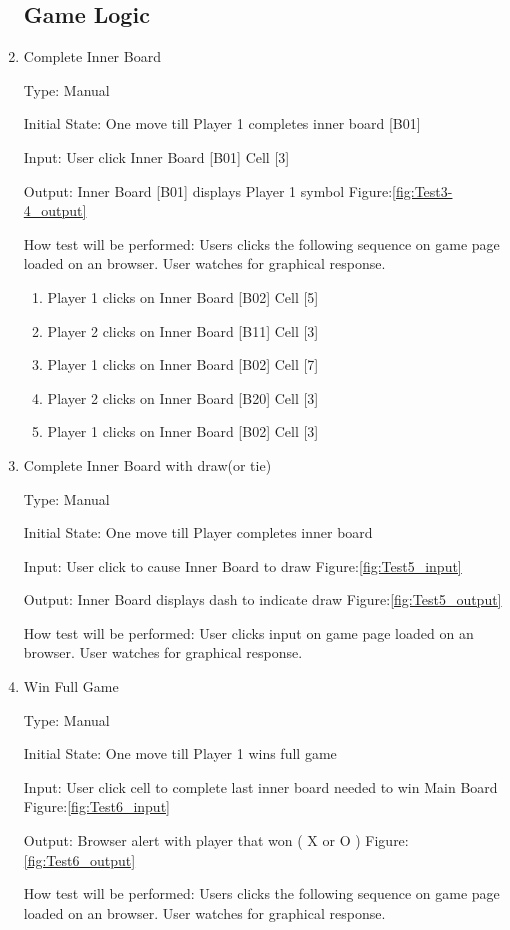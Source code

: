 \documentclass[12pt, titlepage]{article}
\begin{document}
\begin{enumerate}
\subsection{Game Logic}

\item{Complete Inner Board\\}

Type: Manual
					
Initial State: One move till Player 1 completes inner board [B01]
					
Input: User click Inner Board [B01] Cell [3] 
					
Output:  Inner Board [B01] displays Player 1 symbol Figure:\ref{fig:Test3-4_output}
					
How test will be performed: Users clicks the following sequence on game page
loaded on an browser. User watches for graphical response.
\begin{enumerate}
	\item Player 1 clicks on Inner Board [B02] Cell [5]
	\item Player 2 clicks on Inner Board [B11] Cell [3]
	\item Player 1 clicks on Inner Board [B02] Cell [7]
	\item Player 2 clicks on Inner Board [B20] Cell [3]
	\item Player 1 clicks on Inner Board [B02] Cell [3]
\end{enumerate}

\item{Complete Inner Board with draw(or tie) \\}

Type: Manual
					
Initial State: One move till Player completes inner board
					
Input: User click to cause Inner Board to draw Figure:\ref{fig:Test5_input}
					
Output:  Inner Board displays dash to indicate draw Figure:\ref{fig:Test5_output}
					
How test will be performed: User clicks input on game page loaded on an
browser. User watches for graphical response.

\item{Win Full Game\\}

Type: Manual
					
Initial State: One move till Player 1 wins full game
					
Input: User click cell to complete last inner board needed to win Main Board
Figure:\ref{fig:Test6_input}
					
Output:  Browser alert with player that won ( X or O ) Figure:\ref{fig:Test6_output}
					
How test will be performed: Users clicks the following sequence on game page
loaded on an browser. User watches for graphical response.

\end{enumerate}
	
\end{document}
